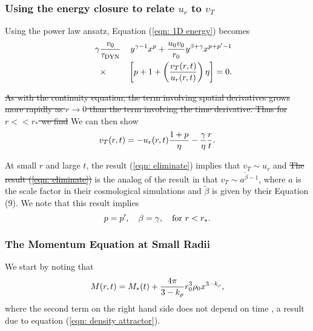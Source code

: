\documentclass[iop,apj,numberedappendix]{emulateapj}
\newcommand       \phil[1]      {{\color{blue} #1}}
\newcommand       \be		{\begin{equation}}
\newcommand       \ee		{\end{equation}}
\newcommand       \bea          {\begin{eqnarray}}
\newcommand       \eea          {\end{eqnarray}}
\newcommand       \etaeff       {\eta}
\newcommand       \tDyn         {\tau_{\rm DYN}}
\begin{document}
\subsubsection{Using the energy closure to relate $u_r$ to $v_T$}\label{sec:energy closure}
Using the power law ansatz, Equation (\ref{eqn: 1D energy}) becomes
% 
\bea  \label{eqn: coupling}%
\gamma&{v_0\over\tDyn}&y^{\gamma-1}x^p+{u_0v_0\over r_0} 
y^{\beta+\gamma}x^{p+p'-1}\nonumber\\
\qquad&\times&
\left[p+1+ \left({v_T(r,t)\over u_r(r,t)}\right)\eta\right]=0.
\eea  %
%

\phil{\sout{As with the continuity equation, the term involving spatial
derivatives grows more rapidly as $r\to0$ than the term involving the
time derivative. Thus for $r<<r_*$ we find} We can then show}
% 
\be \label{eqn: eliminate} %
v_T(r,t)=-u_r(r,t){1+p\over \eta}-{\gamma\over\etaeff}{r\over t}.
\ee  %
%

\phil{At small $r$ and large $t$, the result (\ref{eqn: eliminate}) implies that $v_T \sim u_r$ and \sout{
The result (\ref{eqn: eliminate})}} is the analog of the result in
\citet{2012ApJ...750L..31R} that $v_T\sim a^{\tilde\beta-1}$, where $a$ is
the scale factor in their cosmological simulations and $\tilde\beta$ is
given by their Equation (9). We note that this result implies
%
\be \label{eqn: energy exponent}%
p=p',\quad \beta=\gamma, \quad {\rm for}\ r<r_*.
\ee %
%


\subsubsection{The Momentum Equation at Small Radii}
We start by noting that
%
\be %
M(r,t)=M_*(t) + {4\pi\over 3-k_\rho}r_0^3\rho_0x^{3-k_\rho},
\ee %
%
where the second term on the right hand side does not depend on
time\phil{, a result due to equation (\ref{eqn: density attractor})}. 
\end{document}
